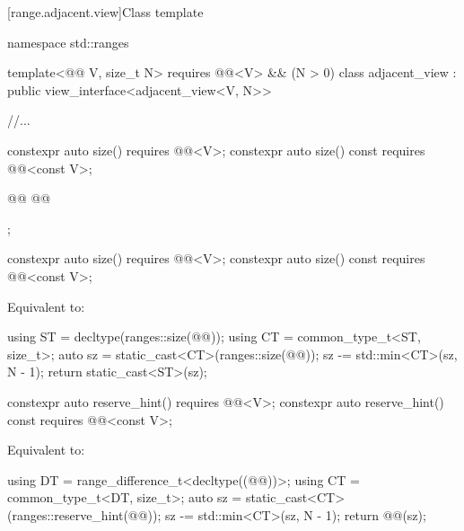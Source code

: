 \documentclass{wg21}
\begin{document}
 [range.adjacent.view]{Class template }

%
%
%
\begin{codeblock}
namespace std::ranges {
template<@@ V, size_t N>
requires @@<V> && (N > 0)
class adjacent_view : public view_interface<adjacent_view<V, N>> {
    //...

    constexpr auto size() requires @@<V>;
    constexpr auto size() const requires @@<const V>;

    @@
    @@

};
}
\end{codeblock}

\begin{itemdecl}
    constexpr auto size() requires @@<V>;
    constexpr auto size() const requires @@<const V>;
\end{itemdecl}

\begin{itemdescr}
    \pnum
    \effects
    Equivalent to:
    \begin{codeblock}
        using ST = decltype(ranges::size(@@));
        using CT = common_type_t<ST, size_t>;
        auto sz = static_cast<CT>(ranges::size(@@));
        sz -= std::min<CT>(sz, N - 1);
        return static_cast<ST>(sz);
    \end{codeblock}
\end{itemdescr}

\begin{addedblock}
\begin{itemdecl}
    constexpr auto reserve_hint() requires @@<V>;
    constexpr auto reserve_hint() const requires @@<const V>;
\end{itemdecl}

\begin{itemdescr}
\pnum
\effects
Equivalent to:
\begin{codeblock}
    using DT = range_difference_t<decltype((@@))>;
    using CT = common_type_t<DT, size_t>;
    auto sz = static_cast<CT>(ranges::reserve_hint(@@));
    sz -= std::min<CT>(sz, N - 1);
    return @@(sz);
\end{codeblock}
\end{itemdescr}
\end{addedblock}
\end{document}
